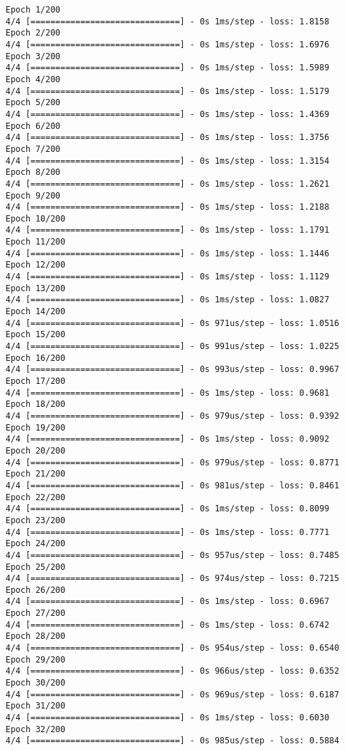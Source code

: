 \documentclass[11pt]{article}
\begin{document}
    \begin{Verbatim}[commandchars=\\\{\}]
Epoch 1/200
4/4 [==============================] - 0s 1ms/step - loss: 1.8158
Epoch 2/200
4/4 [==============================] - 0s 1ms/step - loss: 1.6976
Epoch 3/200
4/4 [==============================] - 0s 1ms/step - loss: 1.5989
Epoch 4/200
4/4 [==============================] - 0s 1ms/step - loss: 1.5179
Epoch 5/200
4/4 [==============================] - 0s 1ms/step - loss: 1.4369
Epoch 6/200
4/4 [==============================] - 0s 1ms/step - loss: 1.3756
Epoch 7/200
4/4 [==============================] - 0s 1ms/step - loss: 1.3154
Epoch 8/200
4/4 [==============================] - 0s 1ms/step - loss: 1.2621
Epoch 9/200
4/4 [==============================] - 0s 1ms/step - loss: 1.2188
Epoch 10/200
4/4 [==============================] - 0s 1ms/step - loss: 1.1791
Epoch 11/200
4/4 [==============================] - 0s 1ms/step - loss: 1.1446
Epoch 12/200
4/4 [==============================] - 0s 1ms/step - loss: 1.1129
Epoch 13/200
4/4 [==============================] - 0s 1ms/step - loss: 1.0827
Epoch 14/200
4/4 [==============================] - 0s 971us/step - loss: 1.0516
Epoch 15/200
4/4 [==============================] - 0s 991us/step - loss: 1.0225
Epoch 16/200
4/4 [==============================] - 0s 993us/step - loss: 0.9967
Epoch 17/200
4/4 [==============================] - 0s 1ms/step - loss: 0.9681
Epoch 18/200
4/4 [==============================] - 0s 979us/step - loss: 0.9392
Epoch 19/200
4/4 [==============================] - 0s 1ms/step - loss: 0.9092
Epoch 20/200
4/4 [==============================] - 0s 979us/step - loss: 0.8771
Epoch 21/200
4/4 [==============================] - 0s 981us/step - loss: 0.8461
Epoch 22/200
4/4 [==============================] - 0s 1ms/step - loss: 0.8099
Epoch 23/200
4/4 [==============================] - 0s 1ms/step - loss: 0.7771
Epoch 24/200
4/4 [==============================] - 0s 957us/step - loss: 0.7485
Epoch 25/200
4/4 [==============================] - 0s 974us/step - loss: 0.7215
Epoch 26/200
4/4 [==============================] - 0s 1ms/step - loss: 0.6967
Epoch 27/200
4/4 [==============================] - 0s 1ms/step - loss: 0.6742
Epoch 28/200
4/4 [==============================] - 0s 954us/step - loss: 0.6540
Epoch 29/200
4/4 [==============================] - 0s 966us/step - loss: 0.6352
Epoch 30/200
4/4 [==============================] - 0s 969us/step - loss: 0.6187
Epoch 31/200
4/4 [==============================] - 0s 1ms/step - loss: 0.6030
Epoch 32/200
4/4 [==============================] - 0s 985us/step - loss: 0.5884

\end{Verbatim}
\end{document}
